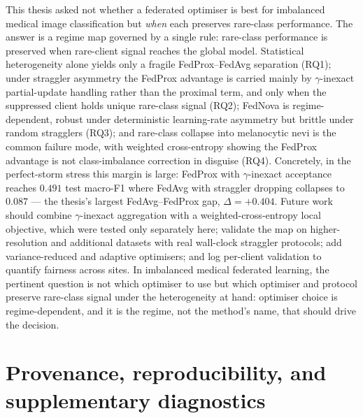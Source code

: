 \documentclass[11pt,a4paper]{report}
\begin{document}
This thesis asked not whether a federated optimiser is best for imbalanced medical
image classification but \emph{when} each preserves rare-class performance. The
answer is a regime map governed by a single rule: rare-class performance is
preserved when rare-client signal reaches the global model. Statistical
heterogeneity alone yields only a fragile FedProx--FedAvg separation (RQ1); under
straggler asymmetry the FedProx advantage is carried mainly by $\gamma$-inexact
partial-update handling rather than the proximal term, and only when the
suppressed client holds unique rare-class signal (RQ2); FedNova is
regime-dependent, robust under deterministic learning-rate asymmetry but brittle
under random stragglers (RQ3); and rare-class collapse into melanocytic nevi is
the common failure mode, with weighted cross-entropy showing the FedProx advantage
is not class-imbalance correction in disguise (RQ4). Concretely, in the
perfect-storm stress this margin is large: FedProx with $\gamma$-inexact
acceptance reaches $0.491$ test macro-F1 where FedAvg with straggler dropping
collapses to $0.087$ --- the thesis's largest FedAvg--FedProx gap, $\Delta =
+0.404$. Future work should combine
$\gamma$-inexact aggregation with a weighted-cross-entropy local objective, which
were tested only separately here; validate the map on higher-resolution and
additional datasets with real wall-clock straggler protocols; add variance-reduced
and adaptive optimisers; and log per-client validation to quantify fairness across
sites. In imbalanced medical federated learning, the pertinent question is not
which optimiser to use but which optimiser and protocol preserve rare-class signal
under the heterogeneity at hand: optimiser choice is regime-dependent, and it is
the regime, not the method's name, that should drive the decision.






\appendix

\chapter{Provenance, reproducibility, and supplementary diagnostics}
\label{app:repro}
\end{document}
